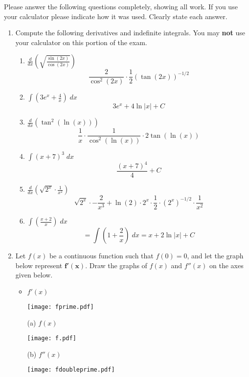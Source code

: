 \documentclass[11pt]{article}
\newcommand{\ds}{\displaystyle}
\begin{document}
\drawtitle

\noindent Please answer the following questions completely, showing all work.
If you use your calculator please indicate how it was used.  Clearly
state each answer.

\begin{enumerate}
\item Compute the following derivatives and indefinite integrals.  You
  may \textbf{not} use your calculator on this portion of the exam.
  \begin{enumerate}
  \item $\ds\frac{d}{dx}\left(\sqrt{\frac{\sin(2x)}{\cos(2x)}}\right)$
    \vfill
    \[
    \frac{2}{\cos^2(2x)}\cdot\frac{1}{2}(\tan(2x))^{-1/2}
    \]
    \vfill
  \item $\ds\int\left(3e^x+\frac{4}{x}\right)\;dx$
    \vfill
    \[
    3e^x+4\ln|x|+C
    \]
    \vfill
    \newpage
  \item $\ds\frac{d}{dx}\left(\tan^2\left(\ln\left(
          x\right)\right)\right)$
    \vfill
    \[
    \frac{1}{x}\cdot\frac{1}{\cos^2(\ln(x))}\cdot 2\tan(\ln(x))
    \]
    \vfill
  \item $\ds\int\left(x+7\right)^3\;dx$
    \vfill
    \[
    \frac{(x+7)^4}{4}+C
    \]
    \vfill
    \newpage
  \item $\ds\frac{d}{dx}\left(\sqrt{2^x}\cdot \frac{1}{x^2}\right)$
    \vfill
    \[
    \sqrt{2^x}\cdot-\frac{2}{x^3}+\ln(2)\cdot2^x\cdot\frac{1}{2}\cdot
    (2^x)^{-1/2}\cdot\frac{1}{x^2}
    \]
    \vfill
  \item $\ds\int\left(\frac{x+2}{x}\right)\;dx$
    \vfill
    \[
    =\int\left(1+\dfrac{2}{x}\right)\;dx=x+2\ln|x|+C
    \]
    \vfill
  \end{enumerate}

  \newpage
  
\item Let $f(x)$ be a continuous function such that $f(0)=0$, and let
  the graph below represent $\mathbf{f'(x)}$.  Draw the graphs of
  $f(x)$ and $f''(x)$ on the axes given below.
  \begin{itemize}
  \item $f'(x)$
    \begin{center}
      \texttt{[image: fprime.pdf]}
    \end{center}
    \vfill
  \item[(a)] $f(x)$
    \begin{center}
      \texttt{[image: f.pdf]}
    \end{center}
    \vfill
  \item[(b)] $f''(x)$
    \begin{center}
      \texttt{[image: fdoubleprime.pdf]}
    \end{center}
    \vfill
  \end{itemize}


\end{enumerate}
\end{document}
